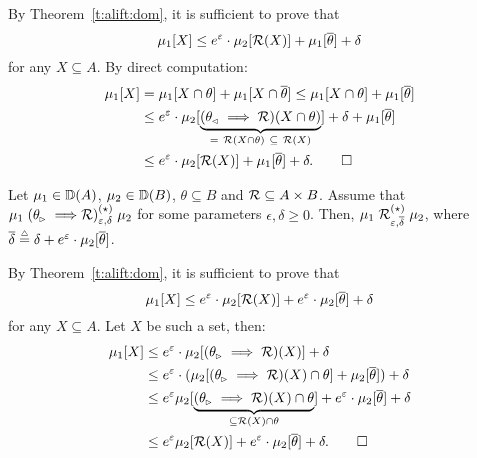 \documentclass{lmcs}
\begin{document}
\proofatend
  By Theorem~\ref{t:alift:dom}, it is sufficient to prove that
  \[ \mu_1[X] \leq e^{\varepsilon} \cdot \mu_2[\mathcal{R}(X)]
       + \mu_1[\overline{\theta}] + \delta \]
  for any $X \subseteq A$. By direct computation:
  \begin{align*}
    \mu_1[X] &= \mu_1[X \cap \theta]
      + \mu_1[X \cap \rcomp{\theta}]
       \leq \mu_1[X \cap \theta] + \mu_1[\rcomp{\theta}] \\
      &\leq e^{\epsilon} \cdot \mu_2[\underbrace{%
            (\theta\lside \implies \oR)(X \cap \theta)%
          }_{=\ \oR(X \cap \theta)\ \subseteq\ \oR(X)}]
        + \delta + \mu_1[\rcomp{\theta}] \\
      &\leq e^{\epsilon} \cdot \mu_2[\oR(X)]
              + \mu_1[\rcomp{\theta}] + \delta. \qedhere
  \end{align*}
\endproofatend

\begin{lem} \label{l:alift:utbr}
  Let $\mu_1 \in {\mathbb{D}}(A)$, $\mu_2 \in {\mathbb{D}}(B)$, $\theta \subseteq B$
  and $\mathcal{R} \subseteq A \times B$. Assume that
  $\mu_1 \mathrel{(\theta_{\mspace{-1.5mu}{\scriptscriptstyle \vartriangleright}} \implies \mathrel{\mathcal{R}})^{(\star)}_{\varepsilon,\delta}} \mu_2$
  for some parameters $\epsilon, \delta \geq 0$.
  Then, $\mu_1 \mathrel{\mathrel{\mathcal{R}}^{(\star)}_{\varepsilon,\overline{\delta}}} \mu_2$,
  where $\overline{\delta} \mathrel{\stackrel{\scriptscriptstyle \triangle}{=}} \delta + e^\varepsilon \cdot \mu_2[\overline{\theta}]$.
\end{lem}

\proofatend
  By Theorem~\ref{t:alift:dom}, it is sufficient to prove that
  \[ \mu_1[X] \leq e^{\varepsilon} \cdot \mu_2[\mathcal{R}(X)]
       + e^{\varepsilon} \cdot \mu_2[\overline{\theta}] + \delta \]
  for any $X \subseteq A$. Let $X$ be such a set, then:
  \begin{align*}
    \mu_1[X]
      &\leq e^{\epsilon} \cdot \mu_2[(\theta\rside \implies \oR)(X)]
             + \delta \\
      &\leq e^{\epsilon} \cdot (
          \mu_2[(\theta\rside \implies \oR)(X) \cap \theta]
            + \mu_2[\rcomp{\theta}]) + \delta \\
      &\leq e^{\epsilon} \mu_2[\underbrace{%
                  (\theta\rside \implies \oR)(X) \cap \theta
                }_{\subseteq \oR(X) \cap \theta}]
              + e^{\epsilon} \cdot \mu_2[\rcomp{\theta}]
              + \delta \\
      &\leq e^{\epsilon} \mu_2[\oR(X)]
              + e^{\epsilon} \cdot \mu_2[\rcomp{\theta}]
              + \delta . \qedhere
  \end{align*}
\endproofatend
\end{document}
